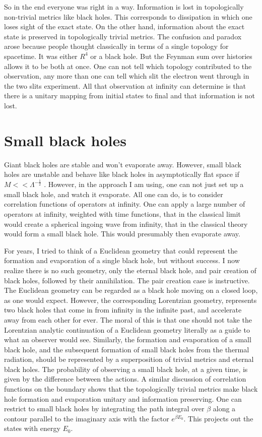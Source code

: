 \documentclass[aps,prd,groupedaddress,showpacs,12pt]{revtex4-1}
\begin{document}
So in the end everyone was right in a way. Information is lost in topologically non-trivial metrics like black holes. This corresponds to dissipation in which one loses sight of the exact state. On the other hand, information about the exact state is preserved in topologically trivial metrics. The confusion and paradox arose because people thought classically in terms of a single topology for spacetime. It was either $R^4$ or a black hole. But the Feynman sum over histories allows it to be both at once. One can not tell which topology contributed to the observation, any more than one can tell which slit the electron went through in the two slits experiment. All that observation at infinity can determine is that there is a unitary mapping from initial states to final and that information is not lost. 

\section{Small black holes} 

Giant black holes are stable and won't evaporate away. However, small black holes are unstable and behave like black holes in asymptotically flat space if $M << \Lambda^{-\frac{1}{2}}$ \cite{HawkingPage}. However, in the approach I am using, one can not just set up a small black hole, and watch it evaporate. All one can do, is to consider correlation functions of operators at infinity. One can apply a large number of operators at infinity, weighted with time functions, that in the classical limit would create a spherical ingoing wave from infinity, that in the classical theory would form a small black hole. This would presumably then evaporate away. 

For years, I tried to think of a Euclidean geometry that could represent the formation and evaporation of a single black hole, but without success. I now realize there is no such geometry, only the eternal black hole, and pair creation of black holes, followed by their annihilation. The pair creation case is instructive. The Euclidean geometry can be regarded as a black hole moving on a closed loop, as one would expect. However, the corresponding Lorentzian geometry, represents two black holes that come in from infinity in the infinite past, and accelerate away from each other for ever. The moral of this is that one should not take the Lorentzian analytic continuation of a Euclidean geometry literally as a guide to what an observer would see. Similarly, the formation and evaporation of a small black hole, and the subsequent formation of small black holes from the thermal radiation, should  be represented  by a superposition of trivial metrics and eternal black holes. The probability of observing a small black hole, at a given time, is given by the difference  between the actions. A similar discussion of correlation functions on the boundary shows that the topologically trivial metrics make black hole formation and evaporation unitary and information preserving.
One can restrict to small black holes by integrating the path integral over 
$\beta$ along a contour parallel to the imaginary axis with the factor $e^{\beta E_0}$. This projects  out the states with energy 
$E_0$. 
\end{document}
